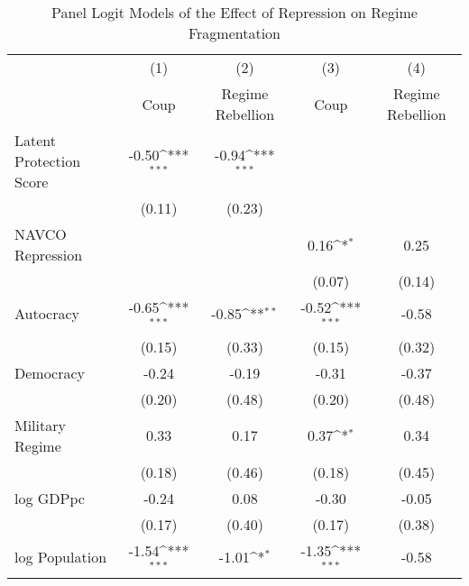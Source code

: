 \begin{table}[htbp]\centering
\def\sym#1{\ifmmode^{#1}\else\(^{#1}\)\fi}
\caption{\label{tab1} Panel Logit Models of the Effect of Repression on Regime Fragmentation}
\begin{tabular}{l*{4}{c}}
\hline\hline
                    &\multicolumn{1}{c}{(1)}         &\multicolumn{1}{c}{(2)}         &\multicolumn{1}{c}{(3)}         &\multicolumn{1}{c}{(4)}         \\
                    &        Coup         &Regime Rebellion         &        Coup         &Regime Rebellion         \\
\hline
Latent Protection Score&       -0.50\sym{***}&       -0.94\sym{***}&                     &                     \\
                    &      (0.11)         &      (0.23)         &                     &                     \\
NAVCO Repression    &                     &                     &        0.16\sym{*}  &        0.25         \\
                    &                     &                     &      (0.07)         &      (0.14)         \\
Autocracy           &       -0.65\sym{***}&       -0.85\sym{**} &       -0.52\sym{***}&       -0.58         \\
                    &      (0.15)         &      (0.33)         &      (0.15)         &      (0.32)         \\
Democracy           &       -0.24         &       -0.19         &       -0.31         &       -0.37         \\
                    &      (0.20)         &      (0.48)         &      (0.20)         &      (0.48)         \\
Military Regime     &        0.33         &        0.17         &        0.37\sym{*}  &        0.34         \\
                    &      (0.18)         &      (0.46)         &      (0.18)         &      (0.45)         \\
log GDPpc           &       -0.24         &        0.08         &       -0.30         &       -0.05         \\
                    &      (0.17)         &      (0.40)         &      (0.17)         &      (0.38)         \\
log Population      &       -1.54\sym{***}&       -1.01\sym{*}  &       -1.35\sym{***}&       -0.58         \\

\end{tabular}
\end{table}
